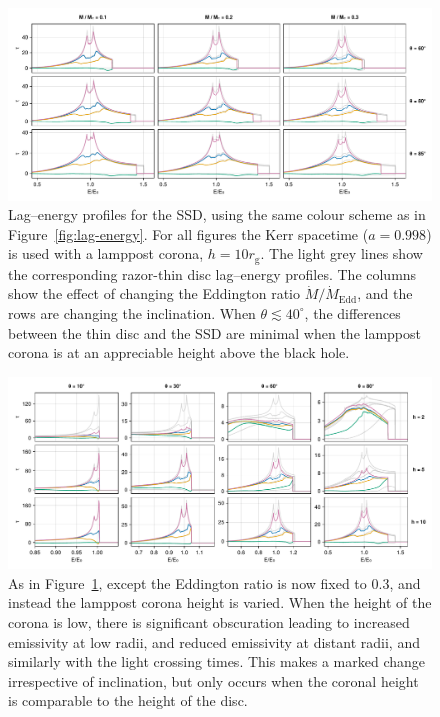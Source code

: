 \documentclass[fleqn,usenatbib]{mnras}
\newcommand{\rg}{r_\text{g}}
\begin{document}
\begin{figure}
    \centering
    \includegraphics[width=0.99\linewidth]{figures/reverberation.thick-disc.pdf}
    \caption{Lag--energy profiles for the SSD, using the same colour scheme as in
        Figure~\ref{fig:lag-energy}. For all figures the Kerr spacetime
        ($a=0.998$) is used with a lamppost corona, $h = 10 \rg$. The light grey
        lines show the corresponding razor-thin disc lag--energy profiles. The
        columns show the effect of changing the Eddington ratio $\dot{M} /
        \dot{M}_\text{Edd}$, and the rows are changing the inclination. When
        $\theta \lesssim 40^\circ$, the differences between the thin disc and
        the SSD are minimal when the lamppost corona is at an appreciable height
        above the black hole.}
    \label{fig:reverb-thick-discs}
\end{figure}

\begin{figure}
    \centering
    \includegraphics[width=0.99\linewidth]{figures/reverberation.thick-disc-corona.pdf}
    \caption{As in Figure~\ref{fig:reverb-thick-discs}, except the Eddington
        ratio is now fixed to $0.3$, and instead the lamppost corona height is
        varied. When the height of the corona is low, there is significant
        obscuration leading to increased emissivity at low radii, and reduced
        emissivity at distant radii, and similarly with the light crossing
    times. This makes a marked change irrespective of inclination, but only
occurs when the coronal height is comparable to the height of the disc.}
    \label{fig:reverb-thick-discs-corona}
\end{figure}
\end{document}
